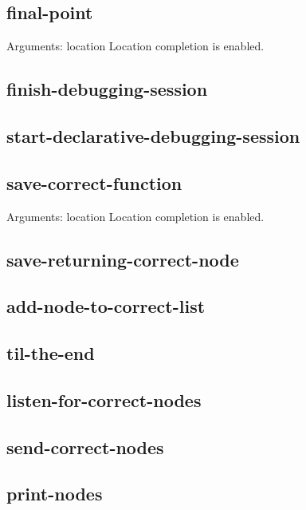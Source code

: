 \subsection{final-point}
Arguments: location
Location completion is enabled.
\subsection{finish-debugging-session}
\subsection{start-declarative-debugging-session}
\subsection{save-correct-function}
Arguments: location
Location completion is enabled.
\subsection{save-returning-correct-node}
\subsection{add-node-to-correct-list}
\subsection{til-the-end}
\subsection{listen-for-correct-nodes}

\subsection{send-correct-nodes}
\subsection{print-nodes}